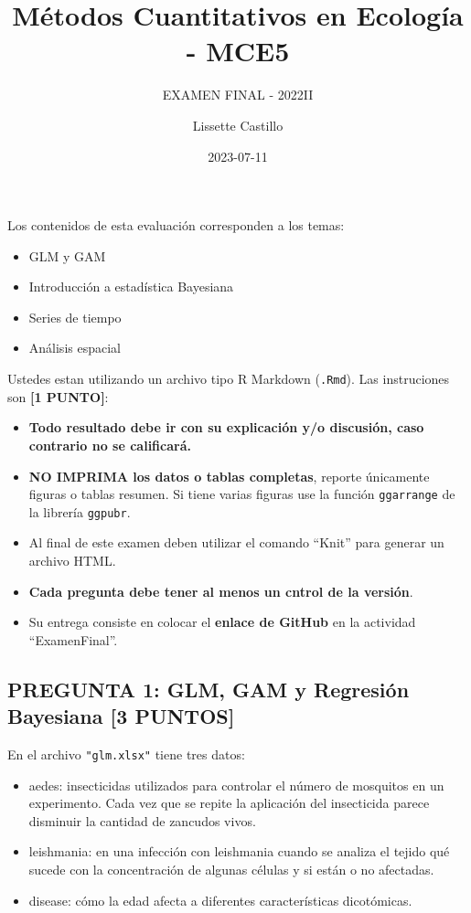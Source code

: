 \documentclass[
]{article}
\title{Métodos Cuantitativos en Ecología - MCE5}
\subtitle{EXAMEN FINAL - 2022II}
\author{Lissette Castillo}
\date{2023-07-11}
\begin{document}
\maketitle

{
\setcounter{tocdepth}{4}
\tableofcontents
}
Los contenidos de esta evaluación corresponden a los temas:

\begin{itemize}
\item
  GLM y GAM
\item
  Introducción a estadística Bayesiana
\item
  Series de tiempo
\item
  Análisis espacial
\end{itemize}

Ustedes estan utilizando un archivo tipo R Markdown (\texttt{.Rmd}). Las
instruciones son \textbf{{[}1 PUNTO{]}}:

\begin{itemize}
\item
  \textbf{Todo resultado debe ir con su explicación y/o discusión, caso
  contrario no se calificará.}
\item
  \textbf{NO IMPRIMA los datos o tablas completas}, reporte únicamente
  figuras o tablas resumen. Si tiene varias figuras use la función
  \texttt{ggarrange} de la librería \texttt{ggpubr}.
\item
  Al final de este examen deben utilizar el comando ``Knit'' para
  generar un archivo HTML.
\item
  \textbf{Cada pregunta debe tener al menos un cntrol de la versión}.
\item
  Su entrega consiste en colocar el \textbf{enlace de GitHub} en la
  actividad ``ExamenFinal''.
\end{itemize}

\hypertarget{pregunta-1-glm-gam-y-regresiuxf3n-bayesiana-3-puntos}{%
\subsection{\texorpdfstring{\textbf{PREGUNTA 1: GLM, GAM y Regresión
Bayesiana {[}3
PUNTOS{]}}}{PREGUNTA 1: GLM, GAM y Regresión Bayesiana {[}3 PUNTOS{]}}}\label{pregunta-1-glm-gam-y-regresiuxf3n-bayesiana-3-puntos}}

En el archivo \texttt{"glm.xlsx"} tiene tres datos:

\begin{itemize}
\item
  aedes: insecticidas utilizados para controlar el número de mosquitos
  en un experimento. Cada vez que se repite la aplicación del
  insecticida parece disminuir la cantidad de zancudos vivos.
\item
  leishmania: en una infección con leishmania cuando se analiza el
  tejido qué sucede con la concentración de algunas células y si están o
  no afectadas.
\item
  disease: cómo la edad afecta a diferentes características dicotómicas.
\end{itemize}
\end{document}

